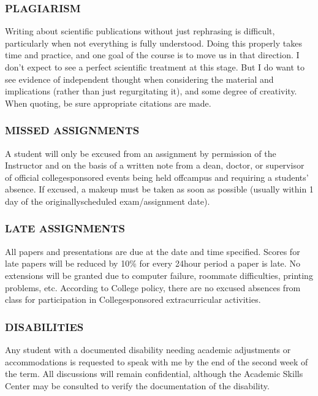 \documentclass[letterpaper,10pt,english]{sphinxmanual}
\begin{document}
\subsubsection{PLAGIARISM}
\label{\detokenize{content/Syllabus:plagiarism}}
Writing about scientific publications without just rephrasing is difficult, particularly when not everything is fully understood. Doing this properly takes time and practice, and one goal of the course is to move us in that direction. I don’t expect to see a perfect scientific treatment at this stage. But I do want to see evidence of independent thought when considering the material and implications (rather than just regurgitating it), and some degree of creativity. When quoting, be sure appropriate citations are made.


\subsubsection{MISSED ASSIGNMENTS}
\label{\detokenize{content/Syllabus:missed-assignments}}
A student will only be excused from an assignment by permission of the Instructor and on the basis of a written note from a dean, doctor, or supervisor of official college\sphinxhyphen{}sponsored events being held off\sphinxhyphen{}campus and requiring a students’ absence. If excused, a make\sphinxhyphen{}up must be taken as soon as possible (usually within 1 day of the originally\sphinxhyphen{}scheduled exam/assignment date).


\subsubsection{LATE ASSIGNMENTS}
\label{\detokenize{content/Syllabus:late-assignments}}
All papers and presentations are due at the date and time specified.  Scores for late papers will be reduced by 10\% for every 24\sphinxhyphen{}hour period a paper is late. No extensions will be granted due to computer failure, roommate difficulties, printing problems, etc.  According to College policy, there are no excused absences from class for participation in College\sphinxhyphen{}sponsored extracurricular activities.


\subsubsection{DISABILITIES}
\label{\detokenize{content/Syllabus:disabilities}}
Any student with a documented disability needing academic adjustments or accommodations is requested to speak with me by the end of the second week of the term. All discussions will remain confidential, although the Academic Skills Center may be consulted to verify the documentation of the disability.
\end{document}
